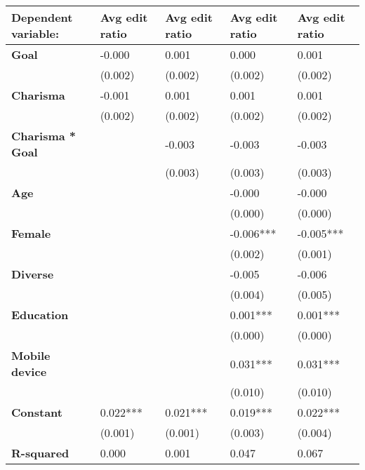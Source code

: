 \begin{tabular}{lllll}
\toprule
\textbf{Dependent variable:} & Avg edit ratio & Avg edit ratio & Avg edit ratio & Avg edit ratio \\
\midrule
\textbf{Goal           } &         -0.000 &          0.001 &          0.000 &          0.001 \\
                &        (0.002) &        (0.002) &        (0.002) &        (0.002) \\
\textbf{Charisma       } &         -0.001 &          0.001 &          0.001 &          0.001 \\
                &        (0.002) &        (0.002) &        (0.002) &        (0.002) \\
\textbf{Charisma * Goal} &                &         -0.003 &         -0.003 &         -0.003 \\
                &                &        (0.003) &        (0.003) &        (0.003) \\
\textbf{Age            } &                &                &         -0.000 &         -0.000 \\
                &                &                &        (0.000) &        (0.000) \\
\textbf{Female         } &                &                &      -0.006*** &      -0.005*** \\
                &                &                &        (0.002) &        (0.001) \\
\textbf{Diverse        } &                &                &         -0.005 &         -0.006 \\
                &                &                &        (0.004) &        (0.005) \\
\textbf{Education      } &                &                &       0.001*** &       0.001*** \\
                &                &                &        (0.000) &        (0.000) \\
\textbf{Mobile device  } &                &                &       0.031*** &       0.031*** \\
                &                &                &        (0.010) &        (0.010) \\
\textbf{Constant       } &       0.022*** &       0.021*** &       0.019*** &       0.022*** \\
                &        (0.001) &        (0.001) &        (0.003) &        (0.004) \\
\textbf{R-squared      } &          0.000 &          0.001 &          0.047 &          0.067 \\

\end{tabular}
